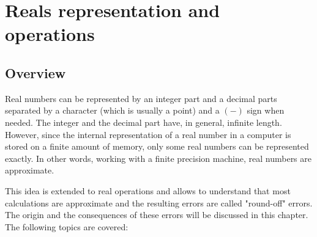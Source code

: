 



\chapter{Reals representation and operations} \label{chap:reals}


    \section*{Overview}

Real numbers can be represented by 
an integer part and a decimal parts separated by a character (which is usually a point) 
and a $(-)$ sign when needed. 
The integer and the decimal part have, in general, infinite length.  
However, since the internal representation of a real number 
in a computer  is stored on a finite amount of memory, 
only some real numbers can be represented exactly. 
In other words, working with a finite precision machine, real numbers are approximate.

This idea is extended to real operations and allows to understand that most calculations 
are approximate and the resulting errors are called "round-off" errors. 
The origin and the consequences of these errors will be discussed in this chapter. 
The following topics are covered: 

